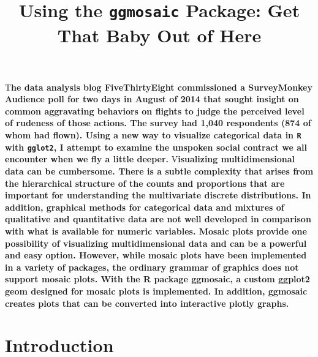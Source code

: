 \documentclass[DIV=calc, paper=a4, fontsize=10pt, twocolumn]{scrartcl}	 %
\title{Using the \texttt{ggmosaic} Package: Get That Baby Out of Here} %
\author{  } %
\date{} %
\newcommand{\initial}[1]{ %
\lettrine[lines=3,lhang=0.3,nindent=0em]{
\color{black}
{\textsf{#1}}}{}}
\begin{document}


\maketitle %

\thispagestyle{fancy} %


\vspace{-1cm}
\initial{T}\textbf{he data analysis blog FiveThirtyEight commissioned a SurveyMonkey Audience poll for two days in August of 2014 that sought insight on common aggravating behaviors on flights to judge the perceived level of rudeness of those actions. The survey had 1,040 respondents (874 of whom had flown). Using a new way to visualize categorical data in \texttt{R} with \texttt{gglot2}, I attempt to examine the unspoken social contract we all encounter when we fly a little deeper.}
\initial{V}\textbf{isualizing multidimensional data can be cumbersome. There is a subtle complexity that arises from the hierarchical structure of the counts and proportions that are important for understanding the multivariate discrete distributions. In addition, graphical methods for categorical data and mixtures of qualitative and quantitative data are not well developed in comparison with what is available for numeric variables. Mosaic plots provide one possibility of visualizing multidimensional data and can be a powerful and easy option. However, while mosaic plots have been implemented in a variety of packages, the ordinary grammar of graphics does not support mosaic plots. With the R package ggmosaic, a custom ggplot2 geom designed for mosaic plots is implemented. In addition, ggmosaic creates plots that can be converted into interactive plotly graphs.}



\section*{Introduction}
\end{document}
